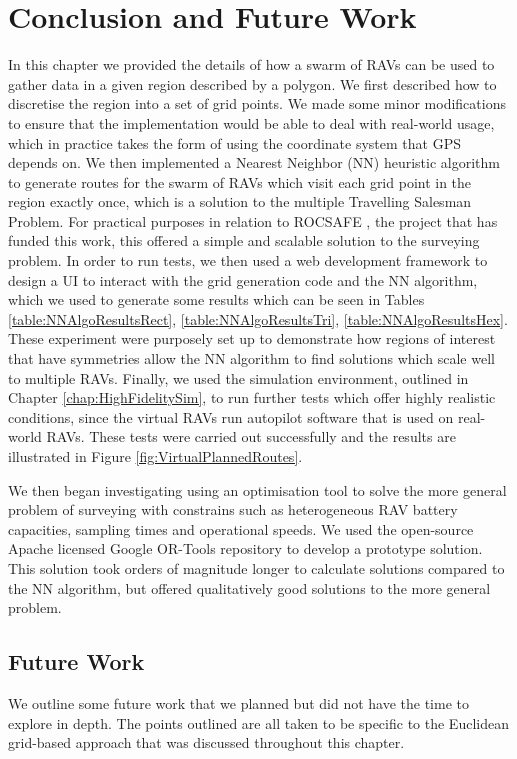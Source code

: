 \section{Conclusion and Future Work}\label{sec:SurveyingConclusionFutureWork}
In this chapter we provided the details of how a swarm of RAVs can be used to gather data in a given region described by a polygon. We first described how to discretise the region into a set of grid points. We made some minor modifications to ensure that the implementation would be able to deal with real-world usage, which in practice takes the form of using the coordinate system that GPS depends on. We then implemented a Nearest Neighbor (NN) heuristic algorithm to generate routes for the swarm of RAVs which visit each grid point in the region exactly once, which is a solution to the multiple Travelling Salesman Problem. For practical purposes in relation to ROCSAFE \cite{Bagherzadeh2017ROCSAFE:Incidents}, the project that has funded this work, this offered a simple and scalable solution to the surveying problem. In order to run tests, we then used a web development framework to design a UI to interact with the grid generation code and the NN algorithm, which we used to generate some results which can be seen in Tables \ref{table:NNAlgoResultsRect}, \ref{table:NNAlgoResultsTri}, \ref{table:NNAlgoResultsHex}. These experiment were purposely set up to demonstrate how regions of interest that have symmetries allow the NN algorithm to find solutions which scale well to multiple RAVs. %
Finally, we used the simulation environment, outlined in Chapter \ref{chap:HighFidelitySim}, to run further tests which offer highly realistic conditions, since the virtual RAVs run autopilot software that is used on real-world RAVs. These tests were carried out successfully and the results are illustrated in Figure \ref{fig:VirtualPlannedRoutes}. 

We then began investigating using an optimisation tool to solve the more general problem of surveying with constrains such as heterogeneous RAV battery capacities, sampling times and operational speeds. We used the open-source Apache licensed Google OR-Tools repository to develop a prototype solution. This solution took orders of magnitude longer to calculate solutions compared to the NN algorithm, but offered qualitatively good solutions to the more general problem.



\subsection{Future Work}
We outline some future work that we planned but did not have the time to explore in depth. The points outlined are all taken to be specific to the Euclidean grid-based approach that was discussed throughout this chapter.

